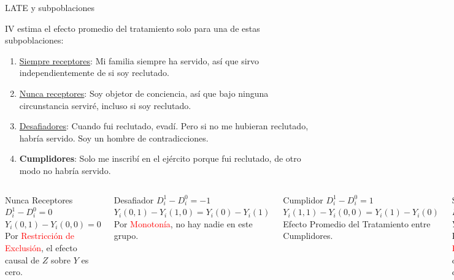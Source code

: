 \documentclass{beamer}
\begin{document}
\begin{frame}{LATE y subpoblaciones}
	
IV estima el efecto promedio del tratamiento solo para una de estas subpoblaciones:
		\begin{enumerate}
		\item \underline{Siempre receptores}: Mi familia siempre ha servido, así que sirvo independientemente de si soy reclutado.
		\item \underline{Nunca receptores}: Soy objetor de conciencia, así que bajo ninguna circunstancia serviré, incluso si soy reclutado.
		\item \underline{Desafiadores}: Cuando fui reclutado, evadí. Pero si no me hubieran reclutado, habría servido. Soy un hombre de contradicciones.
		\item \textbf{Cumplidores}: Solo me inscribí en el ejército porque fui reclutado, de otro modo no habría servido.
		\end{enumerate}
\end{frame}


\begin{frame}[plain]
	\begin{columns}[t]
	\scriptsize
	\begin{block}{Nunca Receptores}
		$D^1_i - D^0_i = 0$ \\
		$Y_i(0,1) - Y_i(0,0) = 0$ \\
		Por \textcolor{red}{Restricción de Exclusión}, el efecto causal de $Z$ sobre $Y$ es cero.
	\end{block}
	\begin{block}{Desafiador}
		$D^1_i - D^0_i = -1$ \\
		$Y_i(0,1) - Y_i(1,0) = Y_i(0) - Y_i(1)$ \\
		Por \textcolor{red}{Monotonía}, no hay nadie en este grupo.
	\end{block}
	\begin{block}{Cumplidor}
		$D^1_i - D^0_i = 1$ \\
		$Y_i(1,1) - Y_i(0,0) = Y_i(1) - Y_i(0)$ \\
		Efecto Promedio del Tratamiento entre Cumplidores.
	\end{block}
	\begin{block}{Siempre Receptores}
		$D^1_i - D^0_i = 0$ \\
		$Y_i(1,1) - Y_i(1,0) = 0$ \\
		Por \textcolor{red}{Restricción de Exclusión}, el efecto causal de $Z$ sobre $Y$ es cero.
	\end{block}
	\end{columns}
\end{frame}
\end{document}
